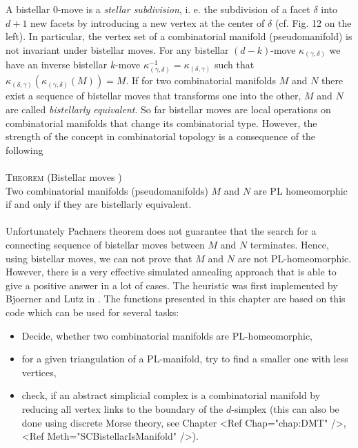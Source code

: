 \documentclass[a4paper,11pt]{report}
\begin{document}
{{ A bistellar $0$-move is a \emph{stellar subdivision}, i. e. the subdivision of a facet $\delta$ into $d+1$ new facets by introducing a new vertex at the center of $\delta$ (cf. Fig. 12 on the left). In particular, the vertex set of a combinatorial
manifold (pseudomanifold) is not invariant under bistellar moves. For any
bistellar $(d-k)$-move $\kappa_{(\gamma,\delta)}$ we have an inverse bistellar $k$-move $\kappa^{-1}_{(\gamma,\delta)} = \kappa_{(\delta,\gamma)}$ such that $\kappa_{(\delta,\gamma)} ( \kappa_{(\gamma,\delta)} (M)) = M$. If for two combinatorial manifolds $M$ and $N$ there exist a sequence of bistellar moves that transforms one into the other, $M$ and $N$ are called \emph{bistellarly equivalent}. So far bistellar moves are local operations on combinatorial manifolds that
change its combinatorial type. However, the strength of the concept in
combinatorial topology is a consequence of the following\\
\\
 \textsc{Theorem} (Bistellar moves \cite{Pachner87KonstrMethKombHomeo})\\
 Two combinatorial manifolds (pseudomanifolds) $M$ and $N$ are PL homeomorphic if and only if they are bistellarly equivalent.\\
\\
 Unfortunately Pachners theorem does not guarantee that the search for a
connecting sequence of bistellar moves between $M$ and $N$ terminates. Hence, using bistellar moves, we can not prove that $M$ and $N$ are not PL-homeomorphic. However, there is a very effective simulated
annealing approach that is able to give a positive answer in a lot of cases.
The heuristic was first implemented by Bjoerner and Lutz in \cite{Bjoerner00SimplMnfBistellarFlips}. The functions presented in this chapter are based on this code which can be
used for several tasks:  \begin{itemize} \item Decide, whether two combinatorial manifolds are
PL-homeomorphic, \item for a given triangulation of a PL-manifold, try to find
a smaller one with less vertices, \item check, if an abstract simplicial
complex is a combinatorial manifold by reducing all vertex links to the
boundary of the $d$-simplex (this can also be done using discrete Morse
theory, see Chapter <Ref Chap="chap:DMT" />, <Ref Meth="SCBistellarIsManifold"
/>). \end{itemize} 

}}
\end{document}
